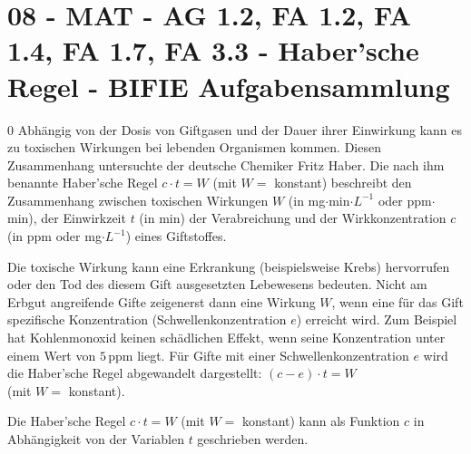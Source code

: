 \section{08 - MAT - AG 1.2, FA 1.2, FA 1.4, FA 1.7, FA 3.3 - Haber'sche Regel - BIFIE Aufgabensammlung}

\begin{langesbeispiel} \item[0] %
Abhängig  von  der  Dosis  von  Giftgasen  und  der  Dauer  ihrer  Einwirkung  kann  es  zu  toxischen  Wirkungen bei lebenden Organismen kommen. Diesen Zusammenhang untersuchte der deutsche Chemiker Fritz Haber. Die nach ihm benannte Haber'sche Regel $c\cdot t=W$ (mit $W=$ konstant) beschreibt den Zusammenhang zwischen toxischen Wirkungen $W$ (in mg$\cdot$min$\cdot L^{-1}$ oder ppm$\cdot$min),  der  Einwirkzeit $t$ (in  min)  der  Verabreichung  und  der  Wirkkonzentration $c$ (in ppm oder mg$\cdot L^{-1}$) eines Giftstoffes.  
				
Die  toxische  Wirkung  kann  eine  Erkrankung  (beispielsweise  Krebs)  hervorrufen  oder  den  Tod  des diesem Gift ausgesetzten Lebewesens bedeuten. Nicht am Erbgut angreifende Gifte zeigenerst dann  eine  Wirkung $W$,  wenn  eine  für  das  Gift  spezifische  Konzentration  (Schwellenkonzentration $e$) erreicht  wird. Zum  Beispiel  hat  Kohlenmonoxid  keinen  schädlichen  Effekt,  wenn seine Konzentration unter einem Wert von $5\,$ppm liegt. Für Gifte mit einer Schwellenkonzentration $e$ wird die Haber'sche Regel abgewandelt dargestellt: $(c-e)\cdot t=W$\\
(mit $W=$ konstant). %

\begin{aufgabenstellung}
\item Die Haber'sche Regel $c\cdot t=W$ (mit $W=$ konstant) kann als Funktion $c$ in Abhängigkeit von der Variablen $t$ geschrieben werden.%

\end{aufgabenstellung}
\end{langesbeispiel}
